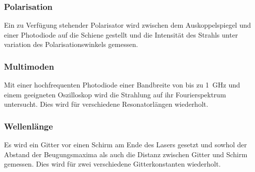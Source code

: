 \subsubsection{Polarisation}
Ein zu Verfügung stehender Polarisator wird zwischen dem Auskoppelspiegel und einer Photodiode auf die Schiene gestellt und die Intensität des Strahls unter variation des Polarisationswinkels gemessen.
\subsubsection{Multimoden}
Mit einer hochfrequenten Photodiode einer Bandbreite von bis zu \SI{1}{\giga\hertz} und einem geeigneten Oszilloskop wird die Strahlung auf ihr Fourierspektrum untersucht. Dies wird für verschiedene Resonatorlängen wiederholt.
\subsubsection{Wellenlänge}
Es wird ein Gitter vor einen Schirm am Ende des Lasers gesetzt und sowhol der Abstand der Beugungsmaxima als auch die Distanz zwischen Gitter und Schirm gemessen. Dies wird für zwei verschiedene Gitterkonstanten wiederholt.
